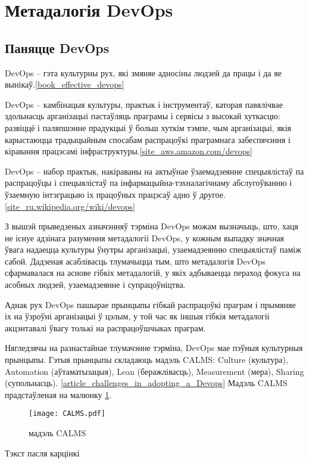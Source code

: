 \section{Метадалогія DevOps}

\subsection{Паняцце DevOps}

DevOps -- гэта культурны рух, які змяняе адносіны людзей да працы і
да яе вынікаў.\ref{book_effective_devops}

DevOps -- камбінацыя культуры, практык і інструментаў,
каторая павялічвае здольнасць арганізацыі пастаўляць праграмы і сервісы
з высокай хуткасцю: развіццё і паляпшэнне прадукцыі ў больш хуткім тэмпе,
чым арганізацыі, якія карыстаюцца традыцыйным спосабам распрацоўкі
праграмнага забеспячэння і
кіравання працэсамі інфраструктуры.\ref{site_aws.amazon.com/devops}

DevOps -- набор практык, накіраваны на актыўнае ўзаемадзеянне
спецыялістаў па распрацоўцы і спецыялістаў па інфармацыйна-тэхналагічнаму
абслугоўванню і ўзаемную інтэграцыю
іх працоўных працэсаў адно ў другое.\ref{site_ru.wikipedia.org/wiki/devops}

З вышэй прыведзеных азначэнняў тэрміна DevOps можам вызначыць,
што, хаця не існуе адзінага разумення метадалогіі DevOps,
у кожным выпадку значная ўвага надаецца культуры ўнутры арганізацыі,
узаемадзеянню спецыялістаў паміж сабой.
Дадзеная асаблівасць тлума\-чыц\-ца тым, што метадалогія DevOps сфармавалася
на аснове гібкіх метадалогій, у якіх адбываецца пераход фокуса на
асобных людзей, узаемадзеянне і супрацоўніцтва.

Аднак рух DevOps пашырае прынцыпы гібкай распрацоўкі праграм
і прымяняе іх на ўзроўні арганізацыі ў цэлым,
у той час як іншыя гібкія метадалогіі акцэнтавалі ўвагу толькі на
распрацоўшчыках праграм.

Нягледзячы на разнастайнае тлумачэнне тэрміна, DevOps мае пэўныя
культурныя прын\-цы\-пы. Гэтыя прынцыпы складаюць мадэль CALMS:
Culture (культура), Automation (аўтаматызацыя),
Lean (беражлівасць), Measurement (мера), Sharing (супольнасць).%
\ref{article_challenges_in_adopting_a_Devops}
Мадэль CALMS прадстаўленая на малюнку \ref{fig:CALMS model}.

\begin{figure}[h!]
    \texttt{[image: CALMS.pdf]}
    \caption{мадэль CALMS}
    \label{fig:CALMS model}
\end{figure}

Тэкст пасля карцінкі
